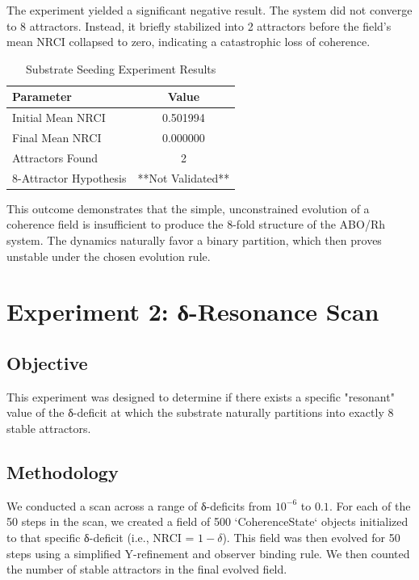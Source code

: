 \documentclass{article}
\begin{document}
The experiment yielded a significant negative result. The system did not converge to 8 attractors. Instead, it briefly stabilized into 2 attractors before the field's mean NRCI collapsed to zero, indicating a catastrophic loss of coherence.

\begin{table}[h!]
\centering
\caption{Substrate Seeding Experiment Results}
\begin{tabular}{lc}
\toprule
\textbf{Parameter} & \textbf{Value} \\
\midrule
Initial Mean NRCI & 0.501994 \\
Final Mean NRCI & 0.000000 \\
Attractors Found & 2 \\
8-Attractor Hypothesis & **Not Validated** \\
\bottomrule
\end{tabular}
\label{tab:exp1_results}
\end{table}

This outcome demonstrates that the simple, unconstrained evolution of a coherence field is insufficient to produce the 8-fold structure of the ABO/Rh system. The dynamics naturally favor a binary partition, which then proves unstable under the chosen evolution rule.

\section{Experiment 2: δ-Resonance Scan}

\subsection{Objective}

This experiment was designed to determine if there exists a specific "resonant" value of the δ-deficit at which the substrate naturally partitions into exactly 8 stable attractors.

\subsection{Methodology}

We conducted a scan across a range of δ-deficits from $10^{-6}$ to $0.1$. For each of the 50 steps in the scan, we created a field of 500 `CoherenceState` objects initialized to that specific δ-deficit (i.e., NRCI = $1 - \delta$). This field was then evolved for 50 steps using a simplified Y-refinement and observer binding rule. We then counted the number of stable attractors in the final evolved field.
\end{document}

